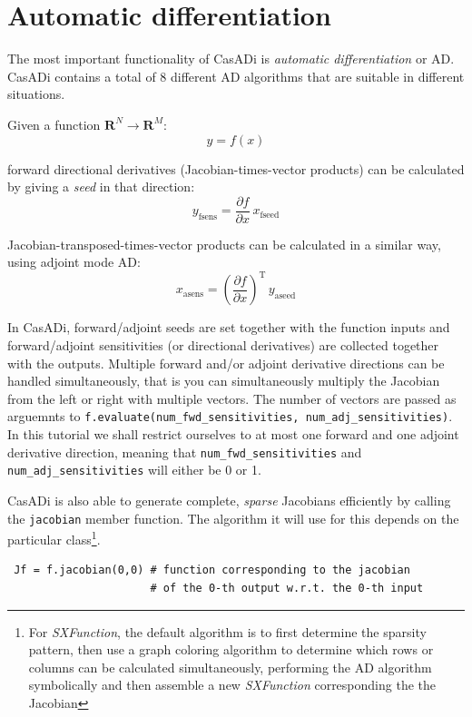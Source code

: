 \documentclass[a4paper,12pt]{book}
\begin{document}
{\chapter{Automatic differentiation\label{chapter:ad}}
The most important functionality of CasADi is \emph{automatic differentiation} or AD. CasADi contains a total of 8 different AD algorithms that are suitable in different situations.

Given a function $\mathbf{R}^N \rightarrow \mathbf{R}^M$:
\begin{equation}
 y = f(x)
\end{equation}

forward directional derivatives (Jacobian-times-vector products) can be calculated by giving a \emph{seed} in that direction:
\begin{equation}
 y_{\text{fsens}} = \frac{\partial f}{\partial x} \, x_{\text{fseed}}
\end{equation}

Jacobian-transposed-times-vector products can be calculated in a similar way, using adjoint mode AD:
\begin{equation}
 x_{\text{asens}} = \left(\frac{\partial f}{\partial x}\right)^{\text{T}} \, y_{\text{aseed}}
\end{equation}

In CasADi, forward/adjoint seeds are set together with the function inputs and forward/adjoint sensitivities (or directional derivatives) are collected together with the outputs. Multiple forward and/or adjoint derivative directions can be handled simultaneously, that is you can simultaneously multiply the Jacobian from the left or right with multiple vectors. The number of vectors are passed as arguemnts to \texttt{f.evaluate(num\_fwd\_sensitivities, num\_adj\_sensitivities)}. In this tutorial we shall restrict ourselves to at most one forward and one adjoint derivative direction, meaning that \texttt{num\_fwd\_sensitivities} and \texttt{num\_adj\_sensitivities} will either be 0 or 1.

CasADi is also able to generate complete, \emph{sparse} Jacobians efficiently by calling the \texttt{jacobian} member function. The algorithm it will use for this depends on the particular class\footnote{For \emph{SXFunction}, the default algorithm is to first determine the sparsity pattern, then use a graph coloring algorithm to determine which rows or columns can be calculated simultaneously, performing the AD algorithm symbolically and then assemble a new \emph{SXFunction} corresponding the the Jacobian}.
\begin{verbatim}
 Jf = f.jacobian(0,0) # function corresponding to the jacobian
                      # of the 0-th output w.r.t. the 0-th input
\end{verbatim}

}
\end{document}
